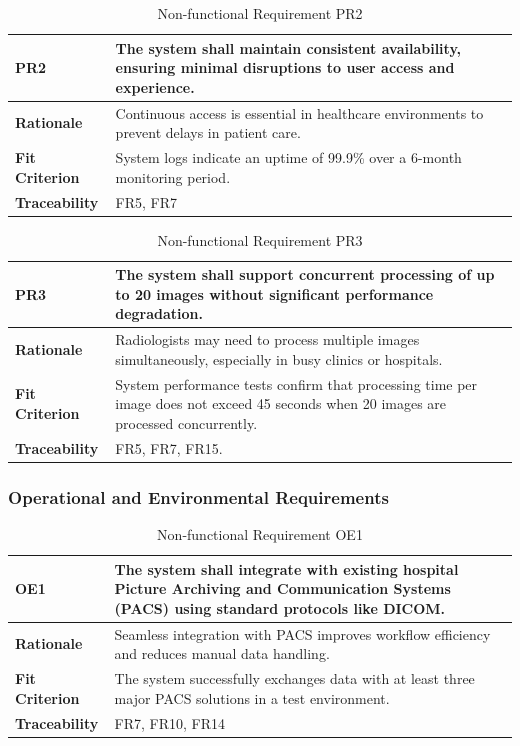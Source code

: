 \documentclass[12pt]{article}
\begin{document}
\begin{table}[h!]
\centering
{}
\begin{tabular}{|p{3.5cm}|p{11.5cm}|}
\hline
\rowcolor{gray!30}
\textbf{PR2} & The system shall maintain consistent availability, ensuring minimal disruptions to user access and experience. \\
\hline
\textbf{Rationale} & Continuous access is essential in healthcare environments to prevent delays in patient care. \\
\hline
\textbf{Fit Criterion} & System logs indicate an uptime of 99.9\% over a 6-month monitoring period. \\
\hline
\textbf{Traceability} & FR5, FR7 \\
\hline
\end{tabular}
\caption{Non-functional Requirement PR2}
\end{table}

\begin{table}[h!]
\centering
{}
\begin{tabular}{|p{3.5cm}|p{11.5cm}|}
\hline
\rowcolor{gray!30}
\textbf{PR3} & The system shall support concurrent processing of up to 20 images without significant performance degradation. \\
\hline
\textbf{Rationale} & Radiologists may need to process multiple images simultaneously, especially in busy clinics or hospitals. \\
\hline
\textbf{Fit Criterion} & System performance tests confirm that processing time per image does not exceed 45 seconds when 20 images are processed concurrently. \\
\hline
\textbf{Traceability} & FR5, FR7, FR15. \\
\hline
\end{tabular}
\caption{Non-functional Requirement PR3}
\end{table}
\newpage
\subsubsection{Operational and Environmental Requirements}

\begin{table}[h!]
\centering
{}
\begin{tabular}{|p{3.5cm}|p{11.5cm}|}
\hline
\rowcolor{gray!30}
\textbf{OE1} & The system shall integrate with existing hospital Picture Archiving and Communication Systems (PACS) using standard protocols like DICOM. \\
\hline
\textbf{Rationale} & Seamless integration with PACS improves workflow efficiency and reduces manual data handling. \\
\hline
\textbf{Fit Criterion} & The system successfully exchanges data with at least three major PACS solutions in a test environment. \\
\hline
\textbf{Traceability} & FR7, FR10, FR14 \\
\hline
\end{tabular}
\caption{Non-functional Requirement OE1}
\end{table}
\end{document}
